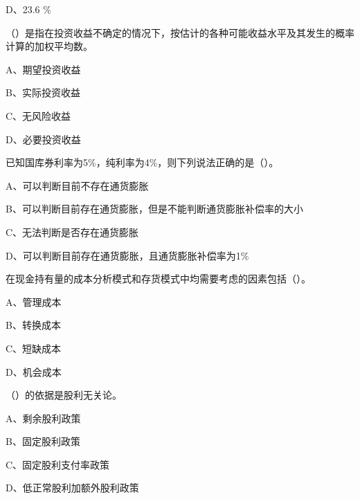 \documentclass[
  10pt,
  twoside,
  openany,
  b5paper, %
  colorscheme = black, %
  xits = false,
]{qyxf-book}
\begin{document}
D、23.6 \%

 （\qquad）是指在投资收益不确定的情况下，按估计的各种可能收益水平及其发生的概率计算的加权平均数。

A、期望投资收益

B、实际投资收益

C、无风险收益

D、必要投资收益

 已知国库券利率为5\%，纯利率为4\%，则下列说法正确的是（\qquad）。

A、可以判断目前不存在通货膨胀

B、可以判断目前存在通货膨胀，但是不能判断通货膨胀补偿率的大小

C、无法判断是否存在通货膨胀

D、可以判断目前存在通货膨胀，且通货膨胀补偿率为1\%

 在现金持有量的成本分析模式和存货模式中均需要考虑的因素包括（\qquad）。

A、管理成本

B、转换成本

C、短缺成本

D、机会成本

 （\qquad）的依据是股利无关论。

A、剩余股利政策

B、固定股利政策

C、固定股利支付率政策

D、低正常股利加额外股利政策
\end{document}
